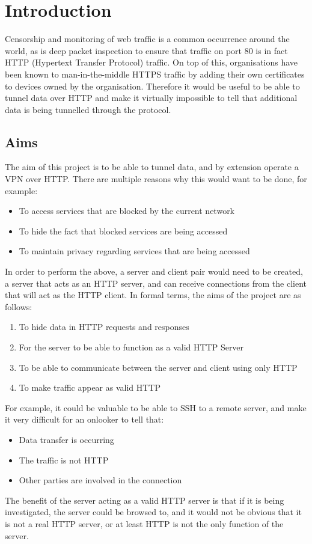 \section{Introduction}
Censorship and monitoring of web traffic is a common occurrence around the world, as is deep packet inspection to ensure that traffic on port 80 is in fact HTTP (Hypertext Transfer Protocol) traffic.
On top of this, organisations have been known to man-in-the-middle HTTPS traffic by adding their own certificates to devices owned by the organisation.
Therefore it would be useful to be able to tunnel data over HTTP and make it virtually impossible to tell that additional data is being tunnelled through the protocol.

\subsection{Aims}
The aim of this project is to be able to tunnel data, and by extension operate a VPN over HTTP\@. There are multiple reasons why this would want to be done, for example:
\begin{itemize}
    \item To access services that are blocked by the current network
    \item To hide the fact that blocked services are being accessed
    \item To maintain privacy regarding services that are being accessed
\end{itemize}
In order to perform the above, a server and client pair would need to be created, a server that acts as an HTTP server, and can receive connections from the client that will act as the HTTP client.
\vspace{0.5cm}
In formal terms, the aims of the project are as follows:
\begin{enumerate}
    \item To hide data in HTTP requests and responses
    \item For the server to be able to function as a valid HTTP Server
    \item To be able to communicate between the server and client using only HTTP
    \item To make traffic appear as valid HTTP
\end{enumerate}
For example, it could be valuable to be able to SSH to a remote server, and make it very difficult for an onlooker to tell that:
\begin{itemize}
    \item Data transfer is occurring
    \item The traffic is not HTTP
    \item Other parties are involved in the connection
\end{itemize}
The benefit of the server acting as a valid HTTP server is that if it is being investigated, the server could be browsed to, and it would not be obvious that it is not a real HTTP server, or at least HTTP is not the only function of the server.

